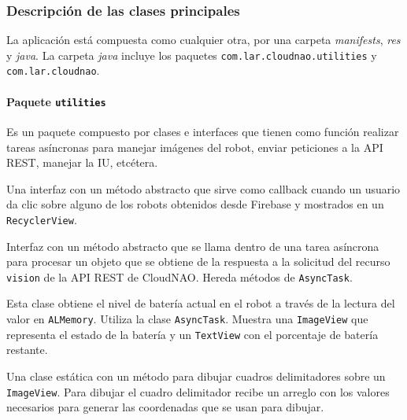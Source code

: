 \subsubsection{Descripción de las clases principales}
\label{\detokenize{dev_docs:documentacion-para-desarrolladores}}

La aplicación está compuesta como cualquier otra, por una
carpeta \textit{manifests}, \textit{res} y \textit{java}.
La carpeta \textit{java} incluye los paquetes \texttt{com.lar.cloudnao.utilities} y \texttt{com.lar.cloudnao}.


\paragraph{Paquete \texttt{utilities}}

Es un paquete compuesto por clases e interfaces que tienen como
función realizar tareas asíncronas para manejar imágenes del robot,
enviar peticiones a la API REST, manejar la IU, etcétera.


Una interfaz con un método abstracto que sirve como callback
cuando un usuario da clic sobre alguno de los robots obtenidos desde Firebase y mostrados en un \texttt{RecyclerView}.


Interfaz con un método abstracto que se llama dentro de una tarea asíncrona para procesar un objeto que se obtiene de la respuesta
a la solicitud del recurso \texttt{vision} de la API REST de CloudNAO.
Hereda métodos de \texttt{AsyncTask}.


Esta clase obtiene el nivel de batería actual en el robot a través de la lectura del valor en 
\texttt{ALMemory}. Utiliza la clase \texttt{AsyncTask}.
Muestra una \texttt{ImageView} que representa el estado de la batería y un \texttt{TextView} con el porcentaje de batería restante.


Una clase estática con un método para dibujar cuadros delimitadores 
sobre un \texttt{ImageView}. Para dibujar el cuadro delimitador 
recibe un arreglo con los valores necesarios para generar las 
coordenadas que se usan para dibujar.

